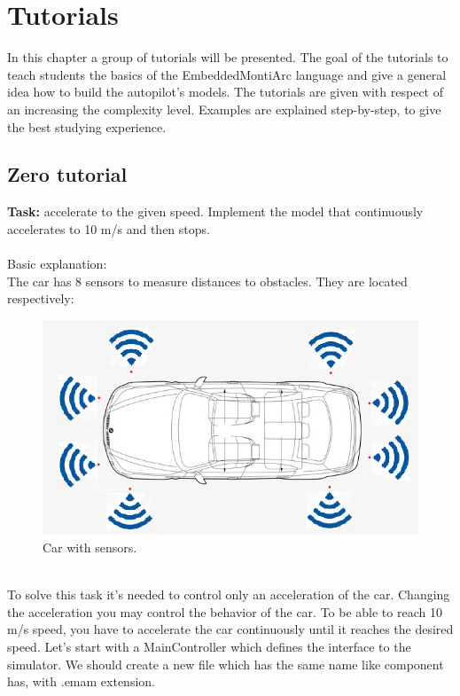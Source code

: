 \chapter{Tutorials}
In this chapter a group of tutorials will be presented. The goal of the tutorials to teach students the basics of the EmbeddedMontiArc language and give a general idea how to build the autopilot's models. The tutorials are given with respect of an increasing the complexity level. Examples are explained step-by-step, to give the best studying experience.
\section{Zero tutorial}
\textbf{Task:} accelerate to the given speed. \newline
Implement the model that continuously accelerates to 10 m/s and then stops.\\ \\
Basic explanation:\\
The car has 8 sensors to measure distances to obstacles. They are located respectively: \\
\begin{figure}[h!]
    \centering
    \includegraphics[width=\linewidth]{src/pic/car-with-sensors}
    \caption{Car with sensors.}
    \label{fig:sensors}
\end{figure} \\
To solve this task it's needed to control only an acceleration of the car. Changing the acceleration you may control the behavior of the car. To be able to reach 10 m/s speed, you have to accelerate the car continuously until it reaches the desired speed. Let's start with a MainController which defines the interface to the simulator. We should create a new file which has the same name like component has, with .emam extension.
